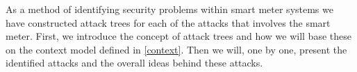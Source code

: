 
As a method of identifying security problems within smart meter systems we have constructed attack trees for each of the attacks that involves the smart meter.
First, we introduce the concept of attack trees and how we will base these on the context model defined in \cref{context}.
Then we will, one by one, present the identified attacks and the overall ideas behind these attacks.
